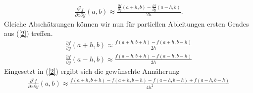 \documentclass[10pt,a4paper]{article}
\begin{document}
	\begin{align}\label{2}
		\frac{\partial^2 f}{\partial x \partial y}(a, b) \approx 
		\frac{
			\frac{\partial f}{\partial y}(a+h,b)-
			\frac{\partial f}{\partial y}(a-h,b)
		}{2h}.
	\end{align}
	Gleiche Abschätzungen können wir nun für partiellen Ableitungen ersten Grades aus (\ref{2}) treffen.
	\begin{align*}
		\frac{\partial f}{\partial y}(a+h,b) \approx
		\frac{f(a+h,b+h)-f(a+h,b-h)}{2h} \\
		\frac{\partial f}{\partial y}(a-h,b) \approx
		\frac{f(a-h,b+h)-f(a-h,b-h)}{2h}
	\end{align*}
	Eingesetzt in (\ref{2}) ergibt sich die gewünschte Annäherung
	\begin{align*}
		\frac{\partial^2 f}{\partial x \partial y}(a, b) \approx
		\frac{f(a+h,b+h)-f(a+h,b-h)-f(a-h,b+h)+f(a-h,b-h)
		}{4h^2}
	\end{align*}
\end{document}
